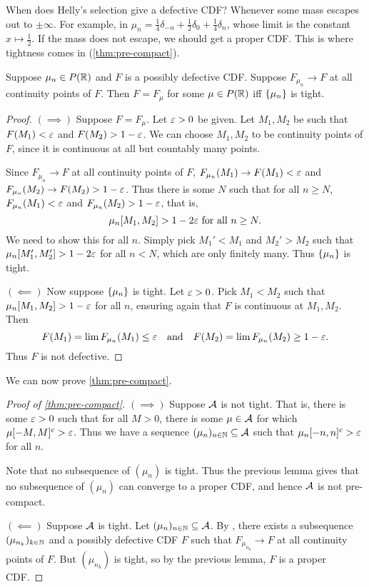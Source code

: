 
When does Helly's selection give a defective CDF?
Whenever some mass escapes out to $\pm \infty$.
For example, in
$\mu_n = \frac14 \delta_{-n} + \frac12 \delta_0 + \frac14 \delta_n$,
whose limit is the constant $x \mapsto \frac12$.
If the mass does not escape, we should get a proper CDF.
This is where tightness comes in (\cref{thm:pre-compact}).

\begin{lemma} \label{thm:limit-defective}
    Suppose $\mu_n \in P(\mathbb{R})$ and $F$ is a possibly defective CDF.
    Suppose $F_{\mu_n} \to F$ at all continuity points of $F$.
    Then $F = F_{\mu}$ for some $\mu \in P(\mathbb{R})$ iff
    $\{\mu_n\}$ is tight.
\end{lemma}
\begin{proof}
    $\bm{({\implies})}$ Suppose $F = F_\mu$.
    Let $\varepsilon > 0$ be given.
    Let $M_1, M_2$ be such that $F(M_1) < \varepsilon$ and $F(M_2) > 1 - \varepsilon$.
    We can choose $M_1, M_2$ to be continuity points of $F$,
    since it is continuous at all but countably many points.

    Since $F_{\mu_n} \to F$ at all continuity points of $F$,
    $F_{\mu_n}(M_1) \to F(M_1) < \varepsilon$ and
    $F_{\mu_n}(M_2) \to F(M_2) > 1 - \varepsilon$.
    Thus there is some $N$ such that for all $n \ge N$,
    $F_{\mu_n}(M_1) < \varepsilon$ and $F_{\mu_n}(M_2) > 1 - \varepsilon$, that is, \[
        \mu_n[M_1, M_2] > 1 - 2\varepsilon \text{ for all } n \ge N.
    \] We need to show this for all $n$.
    Simply pick $M_1' < M_1$ and $M_2' > M_2$ such that
    $\mu_n[M_1', M_2'] > 1 - 2\varepsilon$ for all $n < N$, which are only
    finitely many.
    Thus $\{\mu_n\}$ is tight.

    $\bm{({\impliedby})}$ Now suppose $\{\mu_n\}$ is tight.
    Let $\varepsilon > 0$.
    Pick $M_1 < M_2$ such that $\mu_n[M_1, M_2] > 1 - \varepsilon$ for all $n$,
    ensuring again that $F$ is continuous at $M_1, M_2$.
    Then \[
        F(M_1) = \lim F_{\mu_n}(M_1) \le \varepsilon
        \quad \text{and} \quad
        F(M_2) = \lim F_{\mu_n}(M_2) \ge 1 - \varepsilon.
    \] Thus $F$ is not defective.
\end{proof}

We can now prove \cref{thm:pre-compact}.
\begin{proof}[Proof of \cref{thm:pre-compact}]
    $\bm{(\implies)}$ Suppose $\mathcal{A}$ is not tight.
    That is, there is some $\varepsilon > 0$ such that for all $M > 0$,
    there is some $\mu \in \mathcal{A}$ for which $\mu[-M, M]^c > \varepsilon$.
    Thus we have a sequence $(\mu_n)_{n \in \mathbb{N}} \subseteq \mathcal{A}$ such that
    $\mu_n[-n, n]^c > \varepsilon$ for all $n$.

    Note that no subsequence of $(\mu_n)$ is tight.
    Thus the previous lemma gives that no subsequence of $(\mu_n)$
    can converge to a proper CDF, and hence $\mathcal{A}$ is not pre-compact.

    $\bm{(\impliedby)}$ Suppose $\mathcal{A}$ is tight.
    Let $(\mu_n)_{n \in \mathbb{N}} \subseteq \mathcal{A}$.
    By , there exists a subsequence
    $(\mu_{n_k})_{k \in \mathbb{N}}$ and a possibly defective CDF $F$
    such that $F_{\mu_{n_k}} \to F$ at all continuity points of $F$.
    But $(\mu_{n_k})$ is tight, so by the previous lemma,
    $F$ is a proper CDF.
\end{proof}

